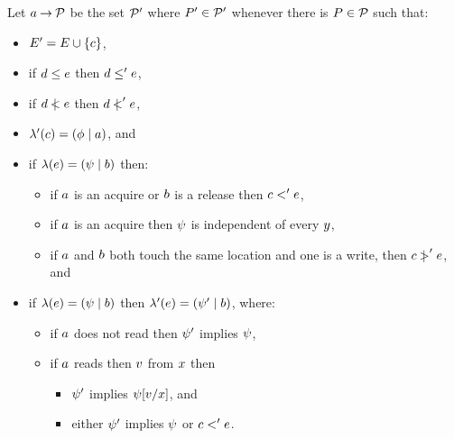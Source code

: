 \begin{definition}
  \label{def:semi:refix}
Let $a \mathbin\rightarrow \mathcal{P}$ be the set $\mathcal{P}'$ where $P'\in\mathcal{P}'$ whenever
there is $P\in\mathcal{P}$ such that:
\begin{itemize}
\item $E' = E \cup \{c\}$,
\item if $d \le e$ then $d \le' e$,
\item if $d \mathrel{\,\mid\!\!\!<} e$ then $d \mathrel{\,\mid\!\!\!<}' e$,
\item $\lambda'(c) = (\phi \mid a)$, and
\item if $\lambda(e) = (\psi \mid b)$ then:
  \begin{itemize}
  \item if $a$ is an acquire or $b$ is a release then $c <' e$, 
  \item if $a$ is an acquire then $\psi$ is independent of every $y$,
  \item if $a$ and $b$ both touch the same location and one is a write,
    then $c \mathrel{\,\mid\!\!\!>}' e$, and
  \end{itemize}
\item if $\lambda(e) = (\psi \mid b)$ then $\lambda'(e) =
  (\psi' \mid b)$, where:
  \begin{itemize}
  \item if $a$ does not read then $\psi'$ implies $\psi$,
  \item if $a$ reads then $v$ from $x$ then
    \begin{itemize}
    \item $\psi'$ implies $\psi[v/x]$, and
    \item either $\psi'$ implies $\psi$ or $c<'e$.
    \end{itemize}
  \end{itemize}

\end{itemize}
\end{definition}
